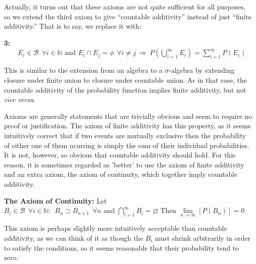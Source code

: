 \documentclass[12pt,a4paper]{article}
\begin{document}
Actually, it turns out that these axioms are not quite sufficient for all purposes, so we extend the third axiom to give ``countable additivity'' instead of just ``finite additivity.'' That is to say, we replace it with:\par
\vspace{10pt}
\textbf{3:} $\qquad E_i\in\mathcal{B}\:\:\forall i\in\mathbb{N}\text{ and }E_i\cap E_j=\phi\:\:\forall i\neq j\:\Rightarrow\:P(\bigcup_{i=1}^{\infty}E_i)=\sum_{i=1}^{\infty}P(E_i)$\par
\vspace{10pt}

This is similar to the extension from an algebra to a $\sigma$-algebra by extending closure under finite union to closure under countable union. As in that case, the countable additivity of the probability function implies finite additivity, but not {\it vice versa}.

Axioms are generally statements that are trivially obvious and seem to require no proof or justification. The axiom of finite additivity has this property, as it seems intuitively correct that if two events are mutually exclusive then the probability of either one of them ocurring is simply the sum of their individual probabilities. It is not, however, so obvious that countable additivity should hold. For this reason, it is sometimes regarded as 'better' to use the axiom of finite additivity and an extra axiom, the axiom of continuity, which together imply countable additivity.\par
\vspace{12pt}

\noindent\textbf{The Axiom of Continuity:} Let $B_i\in\mathcal{B}\:\:\forall i\in\mathbb{N}:\:\:B_n\supset B_{n+1}\:\:\forall n \text{ and }\bigcap\limits_{i=1}^{\infty}B_i=\varnothing$ Then $\lim\limits_{n\rightarrow\infty}[P(B_n)]=0$\par
\vspace{12pt}

This axiom is perhaps slightly more intuitively acceptable than countable additivity, as we can think of it as though the $B_i$ must shrink arbitrarily in order to satisfy the conditions, so it seems reasonable that their probability tend to zero.
\end{document}
